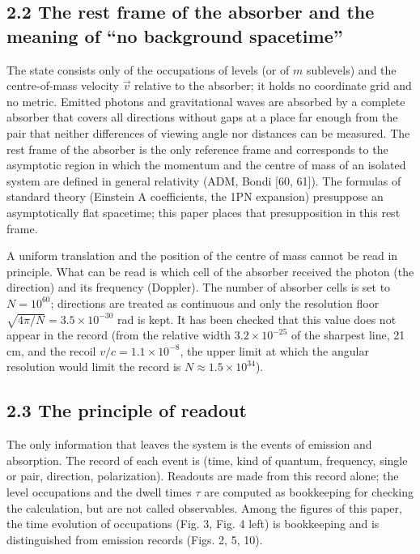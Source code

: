 \documentclass[
  a4paper,
]{article}
\begin{document}
\subsection{2.2 The rest frame of the absorber and the meaning of ``no
background
spacetime''}\label{the-rest-frame-of-the-absorber-and-the-meaning-of-no-background-spacetime}

The state consists only of the occupations of levels (or of \(m\)
sublevels) and the centre-of-mass velocity \(\vec v\) relative to the
absorber; it holds no coordinate grid and no metric. Emitted photons and
gravitational waves are absorbed by a complete absorber that covers all
directions without gaps at a place far enough from the pair that neither
differences of viewing angle nor distances can be measured. The rest
frame of the absorber is the only reference frame and corresponds to the
asymptotic region in which the momentum and the centre of mass of an
isolated system are defined in general relativity (ADM, Bondi {[}60,
61{]}). The formulas of standard theory (Einstein A coefficients, the
1PN expansion) presuppose an asymptotically flat spacetime; this paper
places that presupposition in this rest frame.

A uniform translation and the position of the centre of mass cannot be
read in principle. What can be read is which cell of the absorber
received the photon (the direction) and its frequency (Doppler). The
number of absorber cells is set to \(N=10^{60}\); directions are treated
as continuous and only the resolution floor
\(\sqrt{4\pi/N}=3.5\times10^{-30}\) rad is kept. It has been checked
that this value does not appear in the record (from the relative width
\(3.2\times10^{-25}\) of the sharpest line, 21 cm, and the recoil
\(v/c=1.1\times10^{-8}\), the upper limit at which the angular
resolution would limit the record is \(N\approx1.5\times10^{34}\)).

\subsection{2.3 The principle of
readout}\label{the-principle-of-readout}

The only information that leaves the system is the events of emission
and absorption. The record of each event is (time, kind of quantum,
frequency, single or pair, direction, polarization). Readouts are made
from this record alone; the level occupations and the dwell times
\(\tau\) are computed as bookkeeping for checking the calculation, but
are not called observables. Among the figures of this paper, the time
evolution of occupations (Fig. 3, Fig. 4 left) is bookkeeping and is
distinguished from emission records (Figs. 2, 5, 10).
\end{document}
